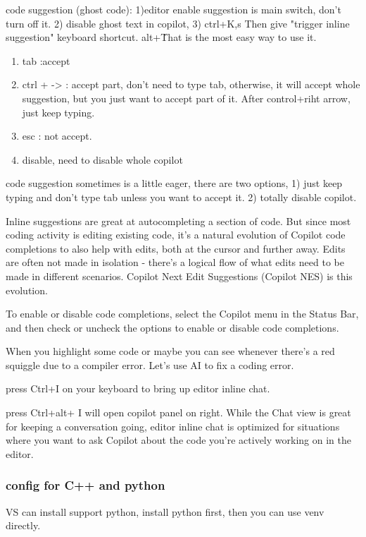 \documentclass[paper=8.5in:11in, twoside, 12pt, pagesize=pdftex]{book}
\begin{document}
code suggestion (ghost code):
1)editor enable suggestion is main switch, don't turn off it. 
2) disable ghost text in copilot, 
3) ctrl+K,s Then give "trigger inline suggestion" keyboard shortcut.  alt+\. That is the most easy way to use it.


\begin{enumerate}
	\item tab :accept
	
	\item ctrl + -> : accept part, don't need to type tab, otherwise, it will accept whole suggestion, but you just want to accept part of it. After control+riht arrow, just keep typing.
	
	\item esc : not accept.
	\item disable, need to disable whole copilot
\end{enumerate}

code suggestion sometimes is a little eager, there are two options, 1) just keep typing and don't type tab unless you want to accept it. 2) totally disable copilot. 

Inline suggestions are great at autocompleting a section of code. But since most coding activity is editing existing code, it's a natural evolution of Copilot code completions to also help with edits, both at the cursor and further away. Edits are often not made in isolation - there's a logical flow of what edits need to be made in different scenarios. Copilot Next Edit Suggestions (Copilot NES) is this evolution.

To enable or disable code completions, select the Copilot menu in the Status Bar, and then check or uncheck the options to enable or disable code completions.

When you highlight some code or maybe you can see whenever there's a red squiggle due to a compiler error. Let's use AI to fix a coding error.

press Ctrl+I on your keyboard to bring up editor inline chat.


press Ctrl+alt+ I will open copilot panel on right. While the Chat view is great for keeping a conversation going, editor inline chat is optimized for situations where you want to ask Copilot about the code you're actively working on in the editor. 

\subsubsection{config for C++ and python}
VS can install support python, install python first, then you can use venv directly. 
	
\end{document}
